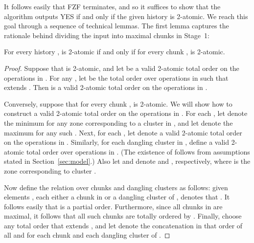 



It follows easily that FZF terminates, and so it suffices to show that
the algorithm outputs YES if and only if the given history  is 2-atomic.
We reach this goal through a sequence of technical lemmas.
The first lemma captures the rationale behind dividing the input into
maximal chunks in Stage~1:

\begin{lemma}
  \label{lemma:subdivide}
  For every history ,  is 2-atomic if and only if for every chunk
  ,  is 2-atomic.
\begin{proof} Suppose that  is 2-atomic, and let  be a valid 2-atomic total order
on the operations in .
For any , let  be the total order over operations
in  such that  extends .
Then  is a valid 2-atomic total order on the operations in .


Conversely, suppose that for every chunk ,  is 2-atomic.
We will show how to construct a valid 2-atomic total order on the operations in .
For each , let  denote the minimum  for any zone 
corresponding to a cluster in , and let  denote the maximum  
for any such .
Next, for each , let  denote a valid 2-atomic total order on the
operations in .
Similarly, for each dangling cluster  in , define a valid 2-atomic total order  over operations in .
(The existence of  follows from assumptions stated in Section~\ref{sec:model}.)
Also let  and  denote  and , respectively, where  is the zone corresponding
to cluster .

Now define the relation  over chunks and dangling clusters as follows:
given elements , each either a chunk in  or a dangling cluster of ,
 denotes that .
It follows easily that  is a partial order.
Furthermore, since all chunks in  are maximal, it follows that all
such chunks are totally ordered by .
Finally, choose any total order that extends , and let  denote the concatenation
in that order of all  and  for each chunk  and 
each dangling cluster  of .


\end{proof}
\end{lemma}
